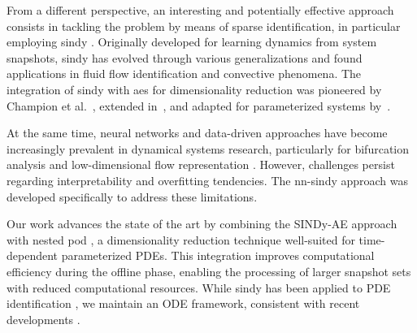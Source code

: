 %

From a different perspective, an interesting and potentially effective approach consists in tackling the problem by means of sparse identification, in particular employing \gls{sindy} \parencite{Brunton_2016}. Originally developed for learning dynamics from system snapshots, \gls{sindy} has evolved through various generalizations \parencite{SINDy_ensemble, SINDyCP, Messenger_2021} and found applications in fluid flow identification \parencite{Fukami_Murata_Zhang_Fukagata_2021, wang_zhang_2024} and convective phenomena. The integration of \gls{sindy} with \glspl{ae} for dimensionality reduction was pioneered by Champion et al.~\parencite{Champion_2019}, extended in~\parencite{DEEPDELAY}, and adapted for parameterized systems by~\parencite{Conti_2023}.

At the same time, neural networks and data-driven approaches have become increasingly prevalent in dynamical systems research, particularly for bifurcation analysis \parencite{Kalia2021LearningNF,PICHI2023105813} and low-dimensional flow representation \parencite{Della_Pia_2024, spider}. However, challenges persist regarding interpretability and overfitting tendencies. The \gls{nn}-\gls{sindy} approach was developed specifically to address these limitations.

Our work advances the state of the art by combining the SINDy-AE approach with nested \gls{pod} \parencite{nested_POD1, nested_POD2}, a dimensionality reduction technique well-suited for time-dependent parameterized PDEs. This integration improves computational efficiency during the offline phase, enabling the processing of larger snapshot sets with reduced computational resources. While \gls{sindy} has been applied to PDE identification \parencite{Zheng2024LESSINDyLS, Rudy_2017, Messenger_2021}, we maintain an ODE framework, consistent with recent developments \parencite{Champion_2019, Conti_2023, VVV}.

%

